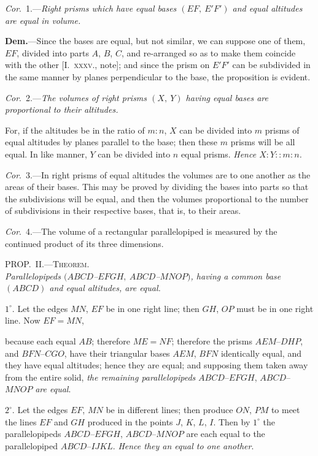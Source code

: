 \documentclass[oneside]{book}
\newcommand\myprop[2]{
\bigskip\Needspace*{4\baselineskip}\begin{center}\textsc{#1}\\\medskip\emph{#2}\par\end{center}
}
\newcommand\imgcent[2]{
\begin{center}

\end{center}
}
\begin{document}
\textit{Cor}.~1.---\textit{Right prisms which have equal bases $(EF,\ E'F')$
and equal altitudes are equal in volume.}


\imgcent{213}{f237}

\textbf{Dem.}---Since the bases are equal, but not similar, we
can suppose one of them, $EF$, divided into parts $A$, $B$, $C$,
and re-arranged so as to make them coincide with the
other [I.~\textsc{xxxv.}, note]; and since the prism on $E'F'$ can
be subdivided in the same manner by planes perpendicular
to the base, the proposition is evident.

\textit{Cor}.~2.---\textit{The volumes of right prisms $(X,\ Y)$ having
equal bases are proportional to their altitudes.}

For, if the altitudes be in the ratio of $m : n$, $X$ can
be divided into $m$ prisms of equal altitudes by planes
parallel to the base; then these $m$ prisms will be all
equal. In like manner, $Y$ can be divided into $n$ equal
prisms. \textit{Hence $X : Y :: m : n$.}

\textit{Cor}.~3.---In right prisms of equal altitudes the
volumes are to one another as the areas of their bases.
This may be proved by dividing the bases into parts
so that the subdivisions will be equal, and then the
volumes proportional to the number of subdivisions in
their respective bases, that is, to their areas.

\textit{Cor}.~4.---The volume of a rectangular parallelopiped
is measured by the continued product of its three dimensions.

\myprop{PROP\@.~II\@.---Theorem.}{Parallelopipeds $(ABCD$--$EFGH,\ ABCD$--$MNOP)$, having
a common base $(ABCD)$ and equal altitudes, are equal.}


\imgcent{250}{f238}

$1^\circ$. Let the edges $MN$, $EF$ be in one right line; then
$GH$, $OP$ must be in one right line. Now $EF = MN$,

because each equal $AB$; therefore $ME=NF$; therefore
the prisms $AEM$--$DHP$, and $BFN$--$CGO$, have their
triangular bases $AEM$, $BFN$ identically equal, and
they have equal altitudes; hence they are equal; and
supposing them taken away from the entire solid, \emph{the
remaining parallelopipeds} $ABCD$--$EFGH$, $ABCD$--$MNOP$
\emph{are equal}.


\imgcent{280}{f239}

$2^{\circ}$. Let the edges $EF$, $MN$ be in different lines;
then produce $ON$, $PM$ to meet the lines $EF$ and $GH$
produced in the points $J$, $K$, $L$, $I$. Then by $1^{\circ}$ the
parallelopipeds $ABCD$--$EFGH$, $ABCD$--$MNOP$ are each
equal to the parallelopiped $ABCD$--$IJKL$. \emph{Hence they
an equal to one another}.
\end{document}
